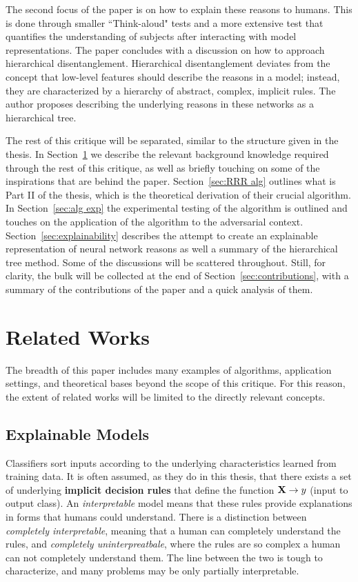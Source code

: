 \documentclass[twoside,11pt]{article}
\begin{document}
The second focus of the paper is on how to explain these reasons to humans. This is done through smaller ``Think-aloud" tests and a more extensive test that quantifies the understanding of subjects after interacting with model representations. The paper concludes with a discussion on how to approach hierarchical disentanglement. Hierarchical disentanglement deviates from the concept that low-level features should describe the reasons in a model; instead, they are characterized by a hierarchy of abstract, complex, implicit rules. The author proposes describing the underlying reasons in these networks as a hierarchical tree. 

The rest of this critique will be separated, similar to the structure given in the thesis. In Section~\ref{sec:related works} we describe the relevant background knowledge required through the rest of this critique, as well as briefly touching on some of the inspirations that are behind the paper. Section~\ref{sec:RRR alg} outlines what is Part II of the thesis, which is the theoretical derivation of their crucial algorithm. In Section~\ref{sec:alg exp} the experimental testing of the algorithm is outlined and touches on the application of the algorithm to the adversarial context. Section~\ref{sec:explainability} describes the attempt to create an explainable representation of neural network reasons as well a summary of the hierarchical tree method. Some of the discussions will be scattered throughout. Still, for clarity, the bulk will be collected at the end of Section~\ref{sec:contributions}, with a summary of the contributions of the paper and a quick analysis of them. 


\section{Related Works}
\label{sec:related works}
The breadth of this paper includes many examples of algorithms, application settings, and theoretical bases beyond the scope of this critique. For this reason, the extent of related works will be limited to the directly relevant concepts.
\subsection{Explainable Models}
Classifiers sort inputs according to the underlying characteristics learned from training data. It is often assumed, as they do in this thesis, that there exists a set of underlying \textbf{implicit decision rules} that define the function $\vb{X} \rightarrow y$ (input to output class). An \textit{interpretable} model means that these rules provide explanations in forms that humans could understand. There is a distinction between \textit{completely interpretable}, meaning that a human can completely understand the rules, and \textit{completely uninterpreatbale}, where the rules are so complex a human can not completely understand them. The line between the two is tough to characterize, and many problems may be only partially interpretable. 
\end{document}
